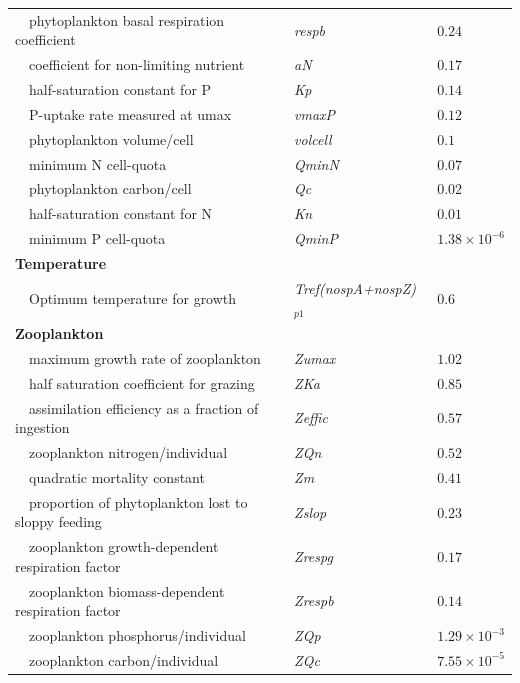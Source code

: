 \documentclass[review]{elsarticle}\usepackage[]{graphicx}\usepackage[]{color}
\begin{document}
\begin{table}[!tbp]
{\begin{center}
\begin{tabular}{lll}
~~phytoplankton basal respiration coefficient&\textit{respb}&$0.24$\tabularnewline
~~coefficient for non-limiting nutrient&\textit{aN}&$0.17$\tabularnewline
~~half-saturation constant for P&\textit{Kp}&$0.14$\tabularnewline
~~P-uptake rate measured at umax&\textit{vmaxP}&$0.12$\tabularnewline
~~phytoplankton volume/cell&\textit{volcell}&$0.1$\tabularnewline
~~minimum N cell-quota&\textit{QminN}&$0.07$\tabularnewline
~~phytoplankton carbon/cell&\textit{Qc}&$0.02$\tabularnewline
~~half-saturation constant for N&\textit{Kn}&$0.01$\tabularnewline
~~minimum P cell-quota&\textit{QminP}&$1.38\times 10^{-6}$\tabularnewline
\hline
{\bfseries Temperature}&&\tabularnewline
~~Optimum temperature for growth&\textit{Tref(nospA+nospZ)$_{p1}$}&$0.6$\tabularnewline
\hline
{\bfseries Zooplankton}&&\tabularnewline
~~maximum growth rate of zooplankton&\textit{Zumax}&$1.02$\tabularnewline
~~half saturation coefficient for grazing&\textit{ZKa}&$0.85$\tabularnewline
~~assimilation efficiency as a fraction of ingestion&\textit{Zeffic}&$0.57$\tabularnewline
~~zooplankton nitrogen/individual&\textit{ZQn}&$0.52$\tabularnewline
~~quadratic mortality constant&\textit{Zm}&$0.41$\tabularnewline
~~proportion of phytoplankton lost to sloppy feeding&\textit{Zslop}&$0.23$\tabularnewline
~~zooplankton growth-dependent respiration factor&\textit{Zrespg}&$0.17$\tabularnewline
~~zooplankton biomass-dependent respiration factor&\textit{Zrespb}&$0.14$\tabularnewline
~~zooplankton phosphorus/individual&\textit{ZQp}&$1.29\times 10^{-3}$\tabularnewline
~~zooplankton carbon/individual&\textit{ZQc}&$7.55\times 10^{-5}$\tabularnewline
\hline
\end{tabular}\end{center}}
\end{table}
\end{document}
